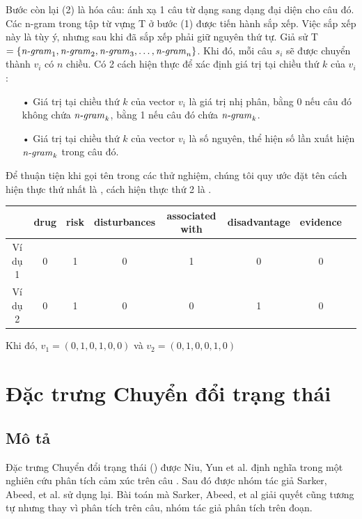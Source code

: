 Bước còn lại (2) là  hóa câu: ánh xạ 1 câu từ dạng  sang dạng  đại diện cho câu đó. Các n-gram trong tập từ vựng T ở bước (1) được tiến hành sắp xếp. Việc sắp xếp này là tùy ý, nhưng sau khi đã sắp xếp phải giữ nguyên thứ tự. Giả sử T $=\{\text{\textit{n-gram}}_1, \text{\textit{n-gram}}_2, \text{\textit{n-gram}}_3, \ldots, \text{\textit{n-gram}}_n\}$. Khi đó, mỗi câu $s_i$ sẽ được chuyển thành  $v_i$ có $n$ chiều. Có 2 cách hiện thực để xác định giá trị tại chiều thứ $k$ của  $v_i$:
\begin{itemize}
\item[•] Giá trị tại chiều thứ $k$ của vector $v_i$ là giá trị nhị phân, bằng 0 nếu câu đó không chứa $\text{\textit{n-gram}}_k$, bằng 1 nếu câu đó chứa $\text{\textit{n-gram}}_k$.
\item[•] Giá trị tại chiều thứ $k$ của vector $v_i$ là số nguyên, thể hiện số lần xuất hiện $\text{\textit{n-gram}}_k$ trong câu đó.
\end{itemize}
Để thuận tiện khi gọi tên trong các thử nghiệm, chúng tôi quy ước đặt tên cách hiện thực thứ nhất là , cách hiện thực thứ 2 là . \\
\begin{tabular}{| c | c | c | c | c | c | c | c |}
\hline
  & \textbf{drug} & \textbf{risk} & \textbf{disturbances} & \textbf{associated with} & \textbf{disadvantage} & \textbf{evidence}
\\ \hline
Ví dụ 1 & 0 & 1 & 0 & 1 & 0 & 0
\\ \hline
Ví dụ 2 & 0 & 1 & 0 & 0 & 1 & 0
\\ \hline
\end{tabular}
\vspace{7px}
Khi đó, $v_1 = (0, 1, 0, 1, 0, 0) $ và $v_2=(0, 1, 0, 0, 1, 0)$
\section{Đặc trưng Chuyển đổi trạng thái}
\subsection*{Mô tả}
Đặc trưng Chuyển đổi trạng thái () được Niu, Yun et al. định nghĩa trong một nghiên cứu phân tích cảm xúc trên câu \cite{niu2005analysis}. Sau đó được nhóm tác giả Sarker, Abeed, et al. sử dụng lại. Bài toán mà Sarker, Abeed, et al giải quyết cũng tương tự nhưng thay vì phân tích trên câu, nhóm tác giả phân tích trên đoạn.\\

